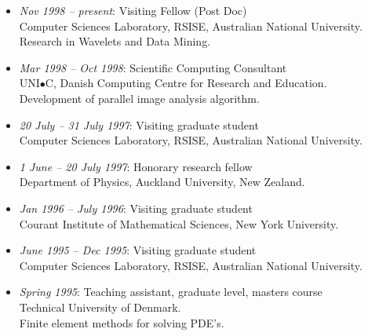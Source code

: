 \documentclass[12pt,a4paper]{article}
\begin{document}
\begin{itemize}
\item {\em Nov 1998 -- present}: Visiting Fellow (Post Doc) \\
      Computer Sciences Laboratory, RSISE, Australian National University.\\ 
      Research in Wavelets and Data Mining.

\item {\em Mar 1998 -- Oct 1998}: Scientific Computing Consultant \\
      UNI$\bullet$C, Danish Computing Centre for Research and Education.\\
      Development of parallel image analysis algorithm.


\item {\em 20 July -- 31 July 1997}: Visiting graduate student \\
      Computer Sciences Laboratory, RSISE, Australian National University. 

\item {\em 1 June -- 20 July 1997}: Honorary research fellow \\
      Department of Physics, Auckland University, New Zealand.

\item {\em Jan 1996 -- July 1996}: Visiting graduate student\\ 
      Courant Institute of Mathematical Sciences, New York University. 

\item {\em June 1995 -- Dec 1995}: Visiting graduate student\\ 
      Computer Sciences Laboratory, RSISE, Australian National University.

\item {\em Spring 1995}: Teaching assistant, graduate level, masters course\\
      Technical University of Denmark. \\
      Finite element methods for solving PDE's. 


\end{itemize}
\end{document}
